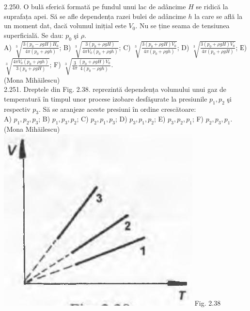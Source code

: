 \documentclass[10pt]{article}
\begin{document}
2.250. O bulă sferică formată pe fundul unui lac de adâncime $H$ se ridică la suprafața apei. Să se afle dependența razei bulei de adâncime $h$ la care se află la un moment dat, dacă volumul inițial este $V_{0}$. Nu se ține seama de tensiunea superficială. Se dau: $p_{0}$ şi $\rho$.\\ A) $\sqrt[3]{\frac{3\left(p_{0}-\rho g H\right) H_{0}}{4 \pi\left(p_{0}+\rho g h\right)}}$; B) $\sqrt[3]{\frac{3\left(p_{0}+\rho g H\right)}{4 \pi V_{0}\left(p_{0}+\rho g h\right)}}$; C) $\sqrt[3]{\frac{3\left(p_{0}+\rho g H\right) V_{0}}{4 \pi\left(p_{0}+\rho g h\right)}}$; D) $\sqrt[3]{\frac{3\left(p_{0}+\rho g H\right) V_{0}}{4 \pi\left(p_{0}+\rho g H\right)}}$; Е) $\sqrt[3]{\frac{4 \pi V_{0}\left(p_{0}+\rho g h\right)}{3\left(p_{0}+\rho g H\right)}}$; F) $\sqrt[3]{\frac{3}{4 \pi} \frac{\left(p_{0}+\rho g H\right) V_{0}}{4\left(p_{0}-\rho g h\right)}}$.\\ (Mona Mihăilescu)\\

2.251. Dreptele din Fig. 2.38. reprezintă dependența volumului unui gaz de temperatură în timpul unor procese izobare desfăşurate la presiunile $p_{1}, p_{2}$ şi respectiv $p_{3}$. Să se aranjeze aceste presiuni în ordine crescătoare:\\ A) $p_{1}, p_{2}, p_{3}$; B) $p_{1}, p_{3}, p_{2}$; C) $p_{2}, p_{1}, p_{3}$; D) $p_{3}, p_{1}, p_{2}$; E) $p_{3}, p_{2}, p_{1}$; F) $p_{2}, p_{3}, p_{1}$.\\ (Mona Mihăilescu)\\ \includegraphics[max width=\textwidth, center]{2025_07_01_5b3ff9fa0d508c8e9f17g-130} Fig. 2.38\\
\end{document}
